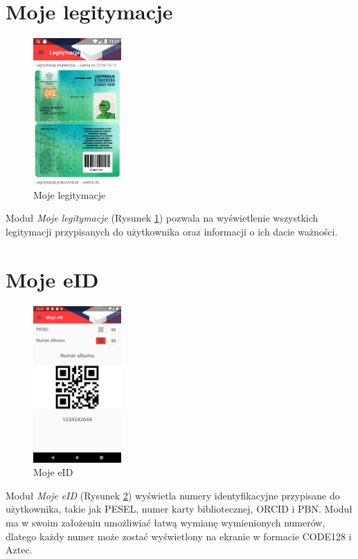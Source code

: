 \documentclass{pracamgr}
\begin{document}
\section{Moje legitymacje}

\begin{figure}[p]
	\centering
	\includegraphics[width=0.3\textwidth]{img/idcards.png}
	\caption{Moje legitymacje}\label{fig:idcards}
	\medskip
\end{figure}

Moduł \textit{Moje legitymacje} (Rysunek \ref{fig:idcards}) pozwala na wyświetlenie
wszystkich legitymacji przypisanych do użytkownika oraz informacji o ich dacie ważności.

\section{Moje eID}

\begin{figure}[p]
	\centering
	\includegraphics[width=0.3\textwidth]{img/myeid.png}
	\caption{Moje eID}\label{fig:myeid}
	\medskip
\end{figure}

Moduł \textit{Moje eID} (Rysunek \ref{fig:myeid}) wyświetla numery identyfikacyjne przypisane do użytkownika, takie jak
PESEL, numer karty bibliotecznej, ORCID i PBN. Moduł ma w swoim założeniu umożliwiać
łatwą wymianę wymienionych numerów, dlatego każdy numer może zostać wyświetlony na
ekranie w formacie CODE128 i Aztec.
\end{document}

